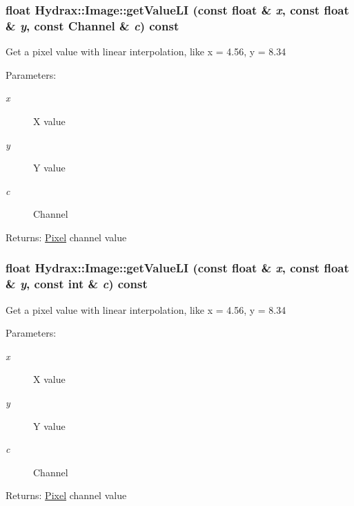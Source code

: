 \begin{CompactItemize}
{\subsubsection[{getValueLI}]{\setlength{\rightskip}{0pt plus 5cm}float Hydrax::Image::getValueLI (const float \& {\em x}, \/  const float \& {\em y}, \/  const {\bf Channel} \& {\em c}) const}}
\label{class_hydrax_1_1_image_75d101bcf467cee66dbafc8c28479c2b}


Get a pixel value with linear interpolation, like x = 4.56, y = 8.34 \begin{Desc}
\item[Parameters:]
\begin{description}
\item[{\em x}]X value \item[{\em y}]Y value \item[{\em c}]Channel \end{description}
\end{Desc}
\begin{Desc}
\item[Returns:]\hyperlink{struct_hydrax_1_1_image_1_1_pixel}{Pixel} channel value \end{Desc}
\hypertarget{class_hydrax_1_1_image_ac15faab325f8dc9df4961e78228a6f8}{
\subsubsection[{getValueLI}]{\setlength{\rightskip}{0pt plus 5cm}float Hydrax::Image::getValueLI (const float \& {\em x}, \/  const float \& {\em y}, \/  const int \& {\em c}) const}}
\label{class_hydrax_1_1_image_ac15faab325f8dc9df4961e78228a6f8}


Get a pixel value with linear interpolation, like x = 4.56, y = 8.34 \begin{Desc}
\item[Parameters:]
\begin{description}
\item[{\em x}]X value \item[{\em y}]Y value \item[{\em c}]Channel \end{description}
\end{Desc}
\begin{Desc}
\item[Returns:]\hyperlink{struct_hydrax_1_1_image_1_1_pixel}{Pixel} channel value \end{Desc}
\hypertarget{class_hydrax_1_1_image_57b7ae07e51805b2744b5d21c0412ecd}{
}
\end{CompactItemize}
